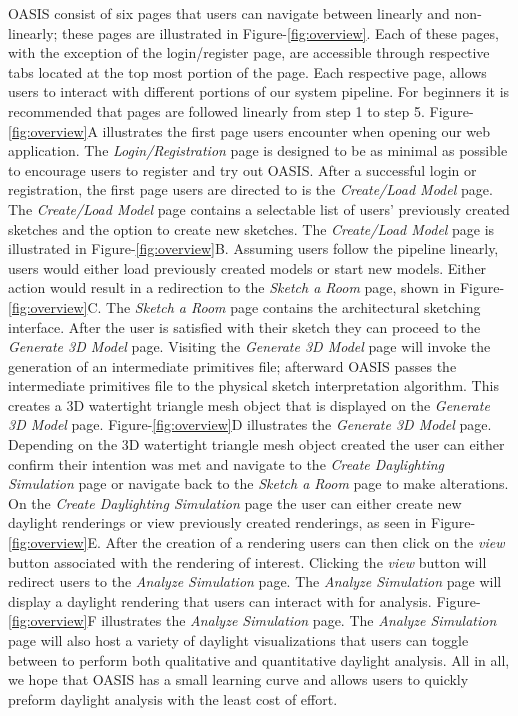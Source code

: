 OASIS consist of six pages that users can navigate between linearly and non-linearly; these pages are illustrated in Figure-\ref{fig:overview}.
Each of these pages, with the exception of the login/register page, are accessible through respective tabs located at the top most portion of the page.
Each respective page, allows users to interact with different portions of our system pipeline.
For beginners it is recommended that pages are followed linearly from step 1 to step 5.
Figure-\ref{fig:overview}A illustrates the first page users encounter when opening our web application.
The \textit{Login/Registration} page is designed to be as minimal as possible to encourage users to register and try out OASIS.
After a successful login or registration, the first page users are directed to is the \textit{Create/Load Model} page.
The \textit{Create/Load Model} page contains a selectable list of users' previously created sketches and the option to create new sketches.
The \textit{Create/Load Model} page is illustrated in Figure-\ref{fig:overview}B.
Assuming users follow the pipeline linearly, users would either load previously created models or start new models.
Either action would result in a redirection to the \textit{Sketch a Room} page, shown in Figure-\ref{fig:overview}C.
The \textit{Sketch a Room} page contains the architectural sketching interface.
After the user is satisfied with their sketch they can proceed to the \textit{Generate 3D Model} page.
Visiting the \textit{Generate 3D Model} page will invoke the generation of an intermediate primitives file; afterward OASIS passes the intermediate primitives file to the physical sketch interpretation algorithm. This creates a 3D watertight triangle mesh object that is displayed on the \textit{Generate 3D Model} page.
Figure-\ref{fig:overview}D illustrates the \textit{Generate 3D Model} page.
Depending on the 3D watertight triangle mesh object created the user can either confirm their intention was met and navigate to the \textit{Create Daylighting Simulation} page or navigate back to the \textit{Sketch a Room} page to make alterations.
On the \textit{Create Daylighting Simulation} page the user can either create new daylight renderings or view previously created renderings, as seen in Figure-\ref{fig:overview}E.
After the creation of a rendering users can then click on the \textit{view} button associated with the rendering of interest.
Clicking the \textit{view} button will redirect users to the \textit{Analyze Simulation} page.
The \textit{Analyze Simulation} page will display a daylight rendering that users can interact with for analysis.
Figure-\ref{fig:overview}F illustrates the \textit{Analyze Simulation} page.
The \textit{Analyze Simulation} page will also host a variety of daylight visualizations that users can toggle between to perform both qualitative and quantitative daylight analysis.
All in all, we hope that OASIS has a small learning curve and allows users to quickly preform daylight analysis with the least cost of effort.

